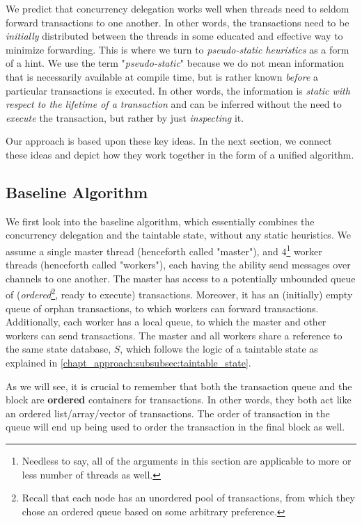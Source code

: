 We predict that concurrency delegation works well when threads need to seldom forward transactions
to one another. In other words, the transactions need to be \textit{initially} distributed between
the threads in some educated and effective way to minimize forwarding. This is where we turn to
\textit{pseudo-static heuristics} as a form of a hint. We use the term "\textit{pseudo-static}"
because we do not mean information that is necessarily available at compile time, but is rather
known \textit{before} a particular transactions is executed. In other words, the information is
\textit{static with respect to the lifetime of a transaction} and can be inferred without the need
to \textit{execute} the transaction, but rather by just \textit{inspecting} it.

Our approach is based upon these key ideas. In the next section, we connect these ideas and
depict how they work together in the form of a unified algorithm.

\subsection{Baseline Algorithm} \label{subsec:baseline_alg}

We first look into the baseline algorithm, which essentially combines the concurrency delegation and
the taintable state, without any static heuristics. We assume a single master thread (henceforth
called "master"), and $4$\footnote{Needless to say, all of the arguments in this section are
applicable to more or less number of threads as well.} worker threads (henceforth called "workers"),
each having the ability send messages over channels to one another. The master has access to a
potentially unbounded queue of (\textit{ordered}\footnote{Recall that each node has an unordered
pool of transactions, from which they chose an ordered queue based on some arbitrary preference.},
ready to execute) transactions. Moreover, it has an (initially) empty queue of orphan transactions,
to which workers can forward transactions. Additionally, each worker has a local queue, to which the
master and other workers can send transactions. The master and all workers share a reference to the
same state database, $S$, which follows the logic of a taintable state as explained in
\ref{chapt_approach:subsubsec:taintable_state}.

\begin{remark}
	As we will see, it is crucial to remember that both the transaction queue and the block are
	\textbf{ordered} containers for transactions. In other words, they both act like an ordered
	list/array/vector of transactions. The order of transaction in the queue will end up being used
	to order the transaction in the final block as well.
\end{remark}

